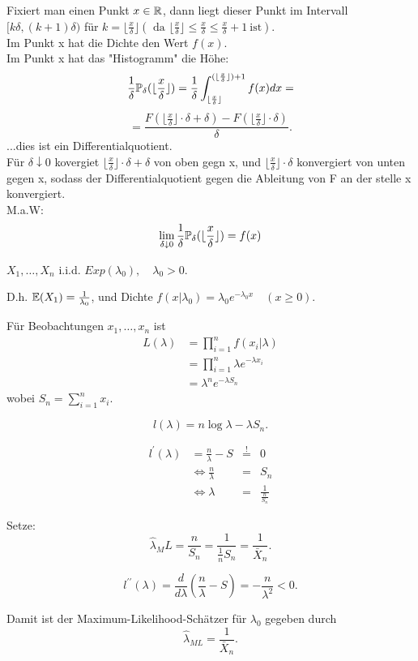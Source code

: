 \documentclass{tstextbook}
\begin{document}
Fixiert man einen Punkt $x \in \mathbb R $, dann liegt dieser Punkt im Intervall \\ 
$ [k\delta, (k+1)\delta)$ für $ k = \lfloor \frac{x}{\delta} \rfloor (\text{ da } \lfloor \frac{x}{\delta} \rfloor \leq \frac{x}{\delta} \leq \frac{x}{\delta}+1 \ \text{ist})$. \\
Im Punkt x hat die Dichte den Wert $f(x)$.\\
Im Punkt x hat das "Histogramm" die Höhe:\\
\[
 \frac{1}{\delta} \mathbb P_\delta (\lfloor \frac{x}{\delta} \rfloor) = \frac{1}{\delta} \int_{\lfloor \frac{x}{\delta} \rfloor}^{(\lfloor \frac{x}{\delta} \rfloor)+1} f(x) dx =
\]
\[
=\frac{ F(\lfloor \frac{x}{\delta} \rfloor \cdot \delta + \delta) - F(\lfloor \frac{x}{\delta} \rfloor \cdot \delta)}{\delta}.
\]
...dies ist ein Differentialquotient.\\
Für $\delta \downarrow 0$ kovergiet $ \lfloor \frac{x}{\delta} \rfloor \cdot \delta + \delta $ von oben gegn x, und $\lfloor \frac{x}{\delta} \rfloor \cdot \delta $ konvergiert von unten gegen x, sodass der Differentialquotient gegen die Ableitung von F an der stelle x konvergiert. \\
M.a.W:  \[ \lim_{\delta \downarrow 0}  \frac{1}{\delta} \mathbb P_{\delta} (\lfloor \frac{x}{\delta} \rfloor)= f(x) \] 


\begin{example}[Exponentialverteilung]
	$ X_1,\ldots,X_n $ i.i.d. $ Exp(\lambda_0), \quad \lambda_0 >0 $. 
	
	D.h. $ \mathbb E(X_1)=\frac{1}{\lambda_0} $, und Dichte $ f(x|\lambda_0) = \lambda_0 e^{-\lambda_0 x} \quad (x\ge0) $.
	
	Für Beobachtungen $ x_1,\ldots,x_n $ ist 
	\[
	\begin{aligned}
		L(\lambda) & = \prod_{i=1}^{n} f(x_i|\lambda) \\
		& = \prod_{i=1}^{n} \lambda e^{-\lambda x_i} \\
		& = \lambda^n e^{-\lambda S_n}
	\end{aligned}
	\]
	wobei $ S_n = \sum_{i=1}^{n} x_i $.
	
	\[
	l(\lambda) = n \log \lambda - \lambda S_n.
	\]
	
	\[
	\begin{aligned}
		l^\prime (\lambda) & = \frac{n}{\lambda} - S &  \overset{!}{=} & 0 \\
		& \Leftrightarrow \frac{n}{\lambda} & = & S_n \\
		& \Leftrightarrow \lambda & = & \frac{1}{\frac{n}{S_n}} 
	\end{aligned}
	\]
	
	Setze:
	\[
	 \hat{\lambda}_ML = \frac{n}{S_n} = \frac{1}{\frac{1}{n} S_n} = \frac{1}{\bar{X}_n}.
	\]
	
	\[
	l^{\prime\prime} (\lambda) = \frac{d}{d\lambda} \left(\frac{n}{\lambda} - S \right) = - \frac{n}{\lambda^2} < 0.
	\]
	
	Damit ist der Maximum-Likelihood-Schätzer für $ \lambda_0 $ gegeben durch 
	\[
	\hat{\lambda}_{ML} = \frac{1}{\bar{X}_n}.
	\]
\end{example}
\end{document}

